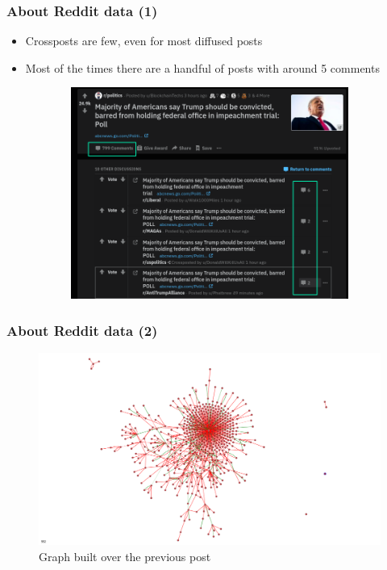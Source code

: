 \documentclass{beamer}
\begin{document}
\begin{frame}[c]
    \frametitle{About Reddit data (1)}
    \begin{itemize}
        \item Crossposts are few, even for most diffused posts
        \item Most of the times there are a handful of posts with around 5
            comments
    \end{itemize}

    \begin{figure}[h]
        \centering
        \begin{subfigure}[b]{0.8\textwidth}
            \begin{center}
                \includegraphics[width=0.8\linewidth]{img/reddit_politics.png}
            \end{center}
        \end{subfigure}
    \end{figure}
\end{frame}

\begin{frame}[c]
    \frametitle{About Reddit data (2)}

    \begin{figure}[h]
        \centering
        \includegraphics[width=\linewidth]{img/reddit_politics_graph.png}
        \caption{Graph built over the previous post}%
        \label{fig:img/reddit_politics_graph}
    \end{figure}
\end{frame}
\end{document}

